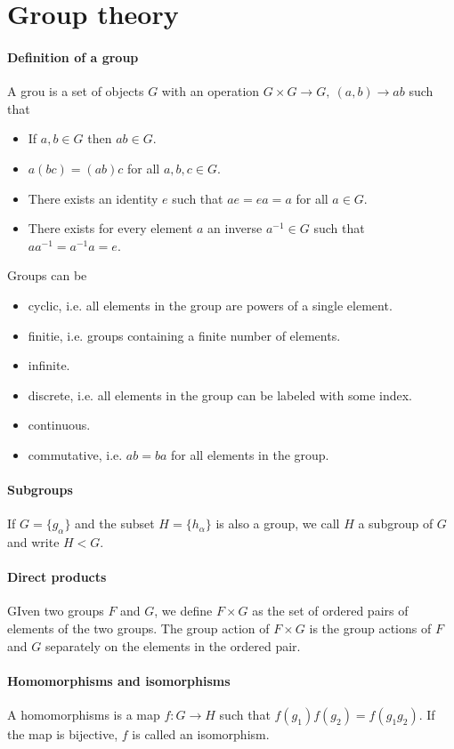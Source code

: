 \section{Group theory}

\paragraph{Definition of a group}
A grou is a set of objects $G$ with an operation $G\times G\to G,\ (a, b)\to ab$ such that
\begin{itemize}
	\item If $a, b\in G$ then $ab\in G$.
	\item $a(bc) = (ab)c$ for all $a, b, c\in G$.
	\item There exists an identity $e$ such that $ae = ea = a$ for all $a\in G$.
	\item There exists for every element $a$ an inverse $a^{-1}\in G$ such that $aa^{-1} = a^{-1}a = e$.
\end{itemize}
Groups can be
\begin{itemize}
	\item cyclic, i.e. all elements in the group are powers of a single element.
	\item finitie, i.e. groups containing a finite number of elements.
	\item infinite.
	\item discrete, i.e. all elements in the group can be labeled with some index.
	\item continuous.
	\item commutative, i.e. $ab = ba$ for all elements in the group.
\end{itemize}

\paragraph{Subgroups}
If $G = \{g_{\alpha}\}$ and the subset $H = \{h_{\alpha}\}$ is also a group, we call $H$ a subgroup of $G$ and write $H < G$.

\paragraph{Direct products}
GIven two groups $F$ and $G$, we define $F\times G$ as the set of ordered pairs of elements of the two groups. The group action of $F\times G$ is the group actions of $F$ and $G$ separately on the elements in the ordered pair.

\paragraph{Homomorphisms and isomorphisms}
A homomorphisms is a map $f: G\to H$ such that $f(g_{1})f(g_{2}) = f(g_{1}g_{2})$. If the map is bijective, $f$ is called an isomorphism.

